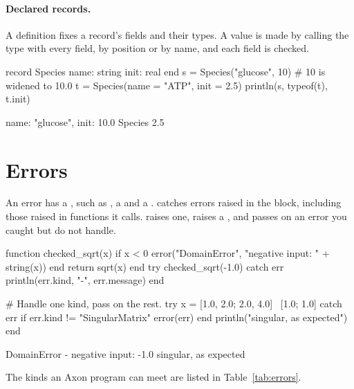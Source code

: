 \documentclass[11pt,a4paper,openany]{report}
\begin{document}
{{\paragraph{Declared records.} A  definition fixes a record's fields
and their types. A value is made by calling the type with every field, by
position or by name, and each field is checked.

\begin{axon}
record Species
  name: string
  init: real
end
s = Species("glucose", 10)        # 10 is widened to 10.0
t = Species(name = "ATP", init = 2.5)
println(s, typeof(t), t.init)
\end{axon}
\begin{axonout}
{name: "glucose", init: 10.0} Species 2.5
\end{axonout}

\section{Errors}\label{sec:errors}

An error has a , such as , a  and a
.  catches errors raised in the
 block, including those raised in functions it calls.
 raises one,  raises a
, and  passes on an error you caught but do not
handle.

\begin{axon}
function checked_sqrt(x)
  if x < 0 error("DomainError", "negative input: " + string(x)) end
  return sqrt(x)
end
try
  checked_sqrt(-1.0)
catch err
  println(err.kind, "-", err.message)
end

# Handle one kind, pass on the rest.
try
  x = [1.0, 2.0; 2.0, 4.0] \ [1.0; 1.0]
catch err
  if err.kind != "SingularMatrix"
    error(err)
  end
  println("singular, as expected")
end
\end{axon}
\begin{axonout}
DomainError - negative input: -1.0
singular, as expected
\end{axonout}

The kinds an Axon program can meet are listed in Table~\ref{tab:errors}.

}}
\end{document}
